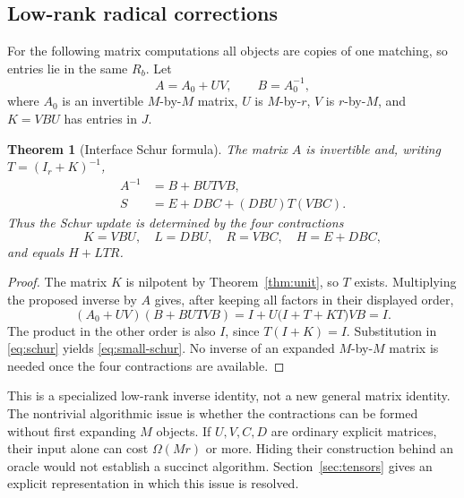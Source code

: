 \documentclass[11pt]{article}
\newtheorem{theorem}{Theorem}[section]
\theoremstyle{definition}\newtheorem{definition}[theorem]{Definition}
\theoremstyle{remark}\newtheorem{remark}[theorem]{Remark}
\begin{document}
\subsection{Low-rank radical corrections}
For the following matrix computations all objects are copies of one matching, so entries lie in the same $R_b$. Let
\[
 A=A_0+UV,\qquad B=A_0^{-1},
\]
where $A_0$ is an invertible $M$-by-$M$ matrix, $U$ is $M$-by-$r$, $V$ is $r$-by-$M$, and $K=VBU$ has entries in $J$.

\begin{theorem}[Interface Schur formula]\label{thm:woodbury}
The matrix $A$ is invertible and, writing $T=(I_r+K)^{-1}$,
\begin{align}
 A^{-1}&=B+BUTVB,\label{eq:woodbury}\\
 S&=E+DBC+(DBU)T(VBC).\label{eq:small-schur}
\end{align}
Thus the Schur update is determined by the four contractions
\begin{equation}\label{eq:four}
 K=VBU,\quad L=DBU,\quad R=VBC,\quad H=E+DBC,
\end{equation}
and equals $H+LTR$.
\end{theorem}
\begin{proof}
The matrix $K$ is nilpotent by Theorem~\ref{thm:unit}, so $T$ exists. Multiplying the proposed inverse by $A$ gives, after keeping all factors in their displayed order,
\[
 (A_0+UV)(B+BUTVB)
 =I+U\bigl(I+T+KT\bigr)VB=I.
\]
The product in the other order is also $I$, since $T(I+K)=I$. Substitution in \eqref{eq:schur} yields \eqref{eq:small-schur}. No inverse of an expanded $M$-by-$M$ matrix is needed once the four contractions are available.
\end{proof}

This is a specialized low-rank inverse identity, not a new general matrix identity. The nontrivial algorithmic issue is whether the contractions can be formed without first expanding $M$ objects. If $U,V,C,D$ are ordinary explicit matrices, their input alone can cost $\Omega(Mr)$ or more. Hiding their construction behind an oracle would not establish a succinct algorithm. Section~\ref{sec:tensors} gives an explicit representation in which this issue is resolved.
\end{document}
